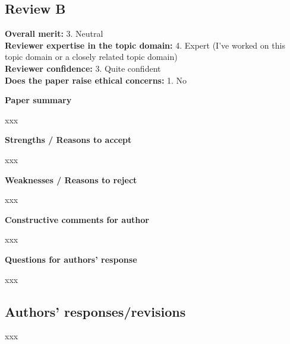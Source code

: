 \documentclass{article}
\begin{document}
\subsection{Review B}
\textbf{Overall merit:} 3. Neutral\\
\textbf{Reviewer expertise in the topic domain:} 4. Expert (I've worked on this topic domain or a closely related topic domain)\\
\textbf{Reviewer confidence:} 3. Quite confident\\
\textbf{Does the paper raise ethical concerns:} 1. No

\rule{0pt}{8pt}

\noindent\textbf{Paper summary}

xxx

\rule{0pt}{8pt}

\noindent\textbf{Strengths / Reasons to accept}

xxx

\rule{0pt}{8pt}

\noindent\textbf{Weaknesses / Reasons to reject}

xxx

\rule{0pt}{8pt}

\noindent\textbf{Constructive comments for author}

xxx

\rule{0pt}{8pt}

\noindent\textbf{Questions for authors’ response}

xxx

\subsection{Authors' responses/revisions}
xxx
\end{document}
